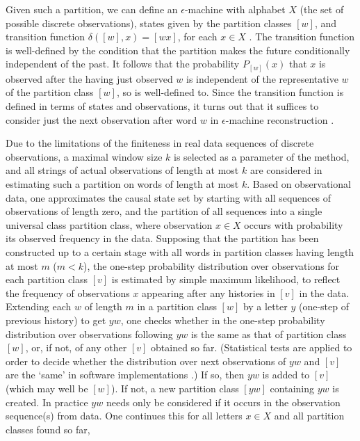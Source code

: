 \documentclass[journal]{IEEEtran}
\begin{document}
 
Given such a partition, we can define an $\epsilon$-machine with alphabet $X$ (the set of possible discrete observations), states given by 
the partition classes $[w]$, and  transition function $\delta([w],x)=[wx]$, for each $x \in X$ .   
The transition function is well-defined by the condition that the partition makes the future conditionally independent of
the past. It follows that the probability $P_{[w]}(x)$ that $x$ is observed after the having just observed $w$ is independent of
the representative $w$ of the partition class $[w]$, so is well-defined to. Since the transition function is defined in terms of states and observations,
it turns out that  it suffices to consider just the next observation after word $w$ in $\epsilon$-machine reconstruction  \cite{Shalizi2003}.
 
 Due to the limitations of the finiteness in real data sequences of discrete observations, a  maximal window size $k$ is selected as a parameter of
 the method, and all strings of actual observations of length at most $k$ are considered in estimating such a partition on words of length at most $k$.   
  Based on observational data, one approximates the causal state set by starting with all   
sequences of observations of length zero, and the partition of all sequences into a single universal class partition class,  
 where observation $x\in X$ occurs with probability its observed frequency in the data.
 Supposing that the partition has been constructed up to a certain stage with
 all words in partition classes having length at most $m$ ($m < k$),  the one-step probability distribution over observations
 for each partition class $[v]$
is estimated by simple maximum likelihood, to reflect the frequency of observations $x$ appearing after any histories in $[v]$ in the data.
 Extending each $w$ of length $m$ in a partition class $[w]$ by a letter $y$ (one-step of previous history) to get $yw$, one checks whether in the one-step probability distribution over observations following $yw$ is the same as that of partition class $[w]$, or, if not, of any other $[v]$ obtained so far.  (Statistical tests are applied to order to decide whether the distribution over next observations of $yw$ and $[v]$ are the `same' in software implementations \cite{Shalizi2004}.)  If so, then $yw$ is added to $[v]$ (which may well be $[w]$).  If not, a new partition class $[yw]$ containing $yw$  is created. In practice $yw$ needs only be considered if it occurs in the observation sequence(s) from data. 
 One continues this for all letters $x \in X$ and all partition classes found so far,
\end{document}
